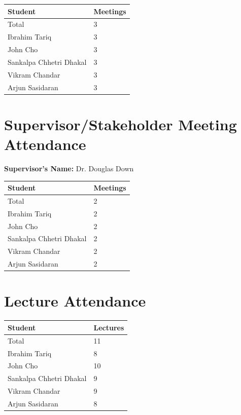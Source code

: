 \documentclass{article}
\begin{document}
\begin{table}[H]
\centering
\begin{tabular}{ll}
\toprule
\textbf{Student} & \textbf{Meetings}\\
\midrule
Total & 3\\
Ibrahim Tariq & 3\\
John Cho & 3\\
Sankalpa Chhetri Dhakal & 3\\
Vikram Chandar & 3\\
Arjun Sasidaran & 3\\
\bottomrule
\end{tabular}
\end{table}

\section{Supervisor/Stakeholder Meeting Attendance}

\noindent \textbf{Supervisor's Name: } Dr. Douglas Down

\begin{table}[H]
\centering
\begin{tabular}{ll}
\toprule
\textbf{Student} & \textbf{Meetings}\\
\midrule
Total & 2\\
Ibrahim Tariq & 2\\
John Cho & 2\\
Sankalpa Chhetri Dhakal & 2\\
Vikram Chandar & 2\\
Arjun Sasidaran & 2\\
\bottomrule
\end{tabular}
\end{table}

\section{Lecture Attendance}

\begin{table}[H]
\centering
\begin{tabular}{ll}
\toprule
\textbf{Student} & \textbf{Lectures}\\
\midrule
Total & 11\\
Ibrahim Tariq & 8\\
John Cho & 10\\
Sankalpa Chhetri Dhakal & 9\\
Vikram Chandar & 9\\
Arjun Sasidaran & 8\\
\bottomrule
\end{tabular}
\end{table}
\end{document}

